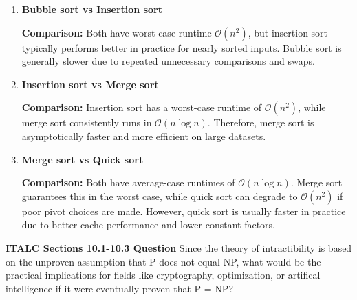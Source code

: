 \documentclass{article}
\theoremstyle{theorem}
\theoremstyle{definition}
\theoremstyle{remark}
\begin{document}
\begin{enumerate}
    \item \textbf{Bubble sort vs Insertion sort}

    \textbf{Comparison:} Both have worst-case runtime \( \mathcal{O}(n^2) \), but insertion sort typically performs better in practice for nearly sorted inputs. Bubble sort is generally slower due to repeated unnecessary comparisons and swaps.

    \item \textbf{Insertion sort vs Merge sort}

    \textbf{Comparison:} Insertion sort has a worst-case runtime of \( \mathcal{O}(n^2) \), while merge sort consistently runs in \( \mathcal{O}(n \log n) \). Therefore, merge sort is asymptotically faster and more efficient on large datasets.

    \item \textbf{Merge sort vs Quick sort}

    \textbf{Comparison:} Both have average-case runtimes of \( \mathcal{O}(n \log n) \). Merge sort guarantees this in the worst case, while quick sort can degrade to \( \mathcal{O}(n^2) \) if poor pivot choices are made. However, quick sort is usually faster in practice due to better cache performance and lower constant factors.
\end{enumerate}

\textbf{ITALC Sections 10.1-10.3 Question}
Since the theory of intractibility is based on the unproven assumption that P does not equal NP, what would be the practical implications for fields like cryptography, optimization, or artifical intelligence if it were eventually proven that P = NP?
\end{document}

